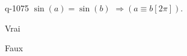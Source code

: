 \begin{truefalse}{q-1075}
$\sin(a)=\sin(b)$  $\Rightarrow \left(a\equiv b [2\pi]\right)$.
\item Vrai
\item* Faux
\end{truefalse}

